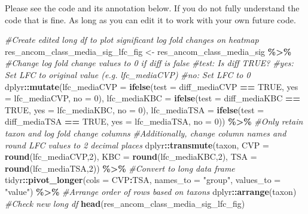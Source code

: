\documentclass[
]{book}
\newenvironment{Shaded}{\begin{snugshade}}{\end{snugshade}}
\newcommand{\AttributeTok}[1]{\textcolor[rgb]{0.13,0.29,0.53}{#1}}
\newcommand{\CommentTok}[1]{\textcolor[rgb]{0.56,0.35,0.01}{\textit{#1}}}
\newcommand{\ConstantTok}[1]{\textcolor[rgb]{0.56,0.35,0.01}{#1}}
\newcommand{\DecValTok}[1]{\textcolor[rgb]{0.00,0.00,0.81}{#1}}
\newcommand{\FunctionTok}[1]{\textcolor[rgb]{0.13,0.29,0.53}{\textbf{#1}}}
\newcommand{\NormalTok}[1]{#1}
\newcommand{\OtherTok}[1]{\textcolor[rgb]{0.56,0.35,0.01}{#1}}
\newcommand{\SpecialCharTok}[1]{\textcolor[rgb]{0.81,0.36,0.00}{\textbf{#1}}}
\newcommand{\StringTok}[1]{\textcolor[rgb]{0.31,0.60,0.02}{#1}}
\begin{document}
Please see the code and its annotation below.
If you do not fully understand the code that is fine.
As long as you can edit it to work with your own future code.

\begin{Shaded}
\begin{Highlighting}[]
\CommentTok{\#Create edited long df to plot significant log fold changes on heatmap}
\NormalTok{res\_ancom\_class\_media\_sig\_lfc\_fig }\OtherTok{\textless{}{-}}\NormalTok{ res\_ancom\_class\_media\_sig }\SpecialCharTok{\%\textgreater{}\%}
  \CommentTok{\#Change log fold change values to 0 if diff is false}
  \CommentTok{\#test: Is diff TRUE?}
  \CommentTok{\#yes: Set LFC to original value (e.g. lfc\_mediaCVP)}
  \CommentTok{\#no: Set LFC to 0}
\NormalTok{  dplyr}\SpecialCharTok{::}\FunctionTok{mutate}\NormalTok{(}\AttributeTok{lfc\_mediaCVP =} \FunctionTok{ifelse}\NormalTok{(}\AttributeTok{test =}\NormalTok{ diff\_mediaCVP }\SpecialCharTok{==} \ConstantTok{TRUE}\NormalTok{,}
                                      \AttributeTok{yes =}\NormalTok{ lfc\_mediaCVP, }\AttributeTok{no =} \DecValTok{0}\NormalTok{),}
                \AttributeTok{lfc\_mediaKBC =} \FunctionTok{ifelse}\NormalTok{(}\AttributeTok{test =}\NormalTok{ diff\_mediaKBC }\SpecialCharTok{==} \ConstantTok{TRUE}\NormalTok{,}
                                      \AttributeTok{yes =}\NormalTok{ lfc\_mediaKBC, }\AttributeTok{no =} \DecValTok{0}\NormalTok{),}
                \AttributeTok{lfc\_mediaTSA =} \FunctionTok{ifelse}\NormalTok{(}\AttributeTok{test =}\NormalTok{ diff\_mediaTSA }\SpecialCharTok{==} \ConstantTok{TRUE}\NormalTok{,}
                                      \AttributeTok{yes =}\NormalTok{ lfc\_mediaTSA, }\AttributeTok{no =} \DecValTok{0}\NormalTok{)) }\SpecialCharTok{\%\textgreater{}\%}
  \CommentTok{\#Only retain taxon and log fold change columns}
  \CommentTok{\#Additionally, change column names and round LFC values to 2 decimal places}
\NormalTok{  dplyr}\SpecialCharTok{::}\FunctionTok{transmute}\NormalTok{(taxon,}
                   \AttributeTok{CVP =} \FunctionTok{round}\NormalTok{(lfc\_mediaCVP,}\DecValTok{2}\NormalTok{),}
                   \AttributeTok{KBC =} \FunctionTok{round}\NormalTok{(lfc\_mediaKBC,}\DecValTok{2}\NormalTok{),}
                   \AttributeTok{TSA =} \FunctionTok{round}\NormalTok{(lfc\_mediaTSA,}\DecValTok{2}\NormalTok{)) }\SpecialCharTok{\%\textgreater{}\%}
  \CommentTok{\#Convert to long data frame}
\NormalTok{  tidyr}\SpecialCharTok{::}\FunctionTok{pivot\_longer}\NormalTok{(}\AttributeTok{cols =}\NormalTok{ CVP}\SpecialCharTok{:}\NormalTok{TSA,}
                      \AttributeTok{names\_to =} \StringTok{"group"}\NormalTok{,}
                      \AttributeTok{values\_to =} \StringTok{"value"}\NormalTok{) }\SpecialCharTok{\%\textgreater{}\%}
  \CommentTok{\#Arrange order of rows based on taxons}
\NormalTok{  dplyr}\SpecialCharTok{::}\FunctionTok{arrange}\NormalTok{(taxon)}
\CommentTok{\#Check new long df}
\FunctionTok{head}\NormalTok{(res\_ancom\_class\_media\_sig\_lfc\_fig)}
\end{Highlighting}
\end{Shaded}
\end{document}
